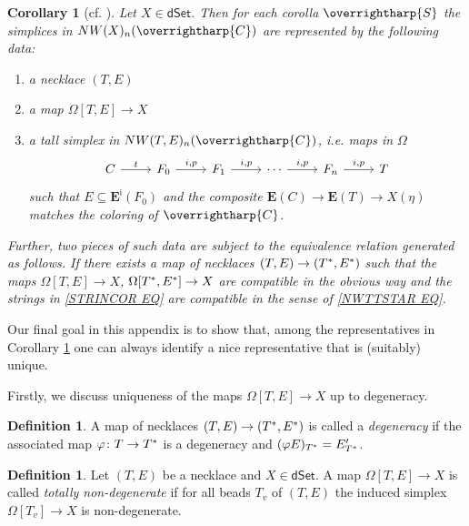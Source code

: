 \documentclass[a4paper,10pt
,draft
]{article}%
\numberwithin{equation}{section}
\numberwithin{figure}{section}
\newtheorem{corollary}[equation]{Corollary}%
\theoremstyle{definition} %
\newtheorem{definition}[equation]{Definition}%
\newcommand{\vect}[1]{\text{\overrightharp{\ensuremath{#1}}}}
\newcommand{\1}{\ensuremath{\mathbbm 1}}%
\begin{document}
\begin{corollary}[{cf. \cite[Cor. 4.8]{DS11}}]
	\label{NWXREPS COR}
	Let $X\in \mathsf{dSet}$.
	Then for each corolla $\vect{S}$ the simplices in 
	$NW(X)_n(\vect{C})$
	are represented by the following data:
\begin{enumerate}[label=(\roman*)]
\item a necklace $(T,E)$ 
\item a map $\Omega[T,E] \to X$
\item a tall simplex in $NW(T,E)_n(\vect{C})$, i.e. maps in $\Omega$
\begin{equation}\label{STRINCOR EQ}
\begin{tikzcd}
	C \ar{r}{t}
&
	F_0 \ar{r}{i,p}
&
	F_1 \ar{r}{i,p}
&
	\cdots
	\ar{r}{i,p}
&
	F_n \ar{r}{i,p}
&
	T
\end{tikzcd}
\end{equation}
such that 
$E \subseteq \boldsymbol{E}^{\mathsf{i}}(F_0)$
and the composite 
$\boldsymbol{E}(C) \to \boldsymbol{E}(T) \to X(\eta)$
matches the coloring of $\vect{C}$.
\end{enumerate}

Further, two pieces of such data are subject to the equivalence relation generated as follows.  
If there exists a map of necklaces $(T,E) \to (T^{\**},E^{\**})$
such that the maps 
$\Omega[T,E] \to X$,
$\Omega[T^{\**},E^{\**}] \to X$
are compatible in the obvious way and the 
strings in \eqref{STRINCOR EQ}
are compatible in the sense of 
\eqref{NWTTSTAR EQ}.
\end{corollary}



Our final goal in this appendix is to show that, 
among the representatives in 
Corollary \ref{NWXREPS COR}
one can always identify a nice representative that is 
(suitably) unique.

Firstly, we discuss uniqueness of 
the maps
$\Omega[T,E] \to X$ up to degeneracy.

\begin{definition}
	A map of necklaces 
	$(T,E) \to (T^{\**},E^{\**})$
	is called a \emph{degeneracy}
	if the associated map
	$\varphi \colon T \to T^{\**}$
	is a degeneracy and
	$(\varphi E)_{T^{\**}} = E'_{T^{\**}}$.
\end{definition}


\begin{definition}
	Let $(T,E)$ be a necklace and $X \in \mathsf{dSet}$.
	A map 
	$\Omega[T,E] \to X$
	is called \emph{totally non-degenerate}
	if for all beads $T_v$ of $(T,E)$
	the induced simplex
	$\Omega[T_v] \to X$
	is non-degenerate.
\end{definition}
\end{document}
